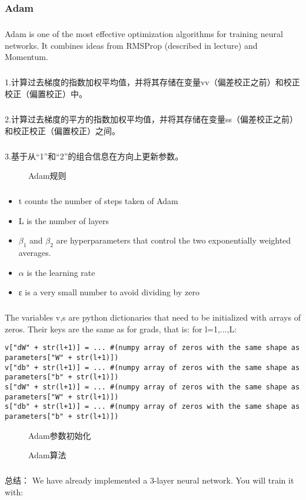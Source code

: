 \documentclass{article}
\begin{document}
\begin{CJK}{UTF8}{gbsn}
\subsubsection{Adam}
\subparagraph{}
Adam is one of the most effective optimization algorithms for training neural networks. It combines ideas from RMSProp (described in lecture) and Momentum. 
\subparagraph{}
1.计算过去梯度的指数加权平均值，并将其存储在变量vv（偏差校正之前）和校正校正（偏置校正）中。
\subparagraph{}
2.计算过去梯度的平方的指数加权平均值，并将其存储在变量ss（偏差校正之前）和校正校正（偏置校正）之间。
\subparagraph{}
3.基于从“1”和“2”的组合信息在方向上更新参数。
\begin{figure}[H]
\label{fig:48}
\caption{Adam规则}
\end{figure}
\subparagraph{}
\begin{itemize}
\item  t counts the number of steps taken of Adam
\item L is the number of layers
\item $\beta_1$ and $\beta_2$ are hyperparameters that control the two exponentially weighted averages.
\item $\alpha$ is the learning rate
\item ε is a very small number to avoid dividing by zero
\end{itemize}
\subparagraph{}
The variables v,s are python dictionaries that need to be initialized with arrays of zeros. Their keys are the same as for grads, that is: for l=1,...,L:
\begin{verbatim}
v["dW" + str(l+1)] = ... #(numpy array of zeros with the same shape as parameters["W" + str(l+1)])
v["db" + str(l+1)] = ... #(numpy array of zeros with the same shape as parameters["b" + str(l+1)])
s["dW" + str(l+1)] = ... #(numpy array of zeros with the same shape as parameters["W" + str(l+1)])
s["db" + str(l+1)] = ... #(numpy array of zeros with the same shape as parameters["b" + str(l+1)])
\end{verbatim}
\begin{figure}[H]
\label{fig:51}
\caption{Adam参数初始化}
\end{figure}
\begin{figure}[H]
\label{fig:50}
\caption{Adam算法}
\end{figure}
\subparagraph{}
总结：
We have already implemented a 3-layer neural network. You will train it with: 

\end{CJK}
\end{document}
